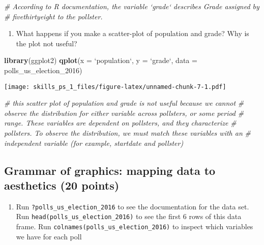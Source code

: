 \documentclass[
]{article}
\newenvironment{Shaded}{\begin{snugshade}}{\end{snugshade}}
\newcommand{\CommentTok}[1]{\textcolor[rgb]{0.56,0.35,0.01}{\textit{#1}}}
\newcommand{\DataTypeTok}[1]{\textcolor[rgb]{0.13,0.29,0.53}{#1}}
\newcommand{\DecValTok}[1]{\textcolor[rgb]{0.00,0.00,0.81}{#1}}
\newcommand{\KeywordTok}[1]{\textcolor[rgb]{0.13,0.29,0.53}{\textbf{#1}}}
\newcommand{\NormalTok}[1]{#1}
\newcommand{\StringTok}[1]{\textcolor[rgb]{0.31,0.60,0.02}{#1}}
\providecommand{\tightlist}{%
  \setlength{\itemsep}{0pt}\setlength{\parskip}{0pt}}
\begin{document}
\begin{Shaded}
\begin{Highlighting}[]
\CommentTok{# According to R documentation, the variable `grade` describes Grade assigned by }
\CommentTok{# fivethirtyeight to the pollster.}
\end{Highlighting}
\end{Shaded}

\begin{enumerate}
\def\labelenumi{\arabic{enumi}.}
\tightlist
\item
  What happens if you make a scatter-plot of population and grade? Why
  is the plot not useful?
\end{enumerate}

\begin{Shaded}
\begin{Highlighting}[]
\KeywordTok{library}\NormalTok{(ggplot2)}
\KeywordTok{qplot}\NormalTok{(}\DataTypeTok{x =} \StringTok{`}\DataTypeTok{population}\StringTok{`}\NormalTok{, }\DataTypeTok{y =} \StringTok{`}\DataTypeTok{grade}\StringTok{`}\NormalTok{, }\DataTypeTok{data =}\NormalTok{ polls_us_election_}\DecValTok{2016}\NormalTok{)}
\end{Highlighting}
\end{Shaded}

\texttt{[image: skills\_ps\_1\_files/figure-latex/unnamed-chunk-7-1.pdf]}

\begin{Shaded}
\begin{Highlighting}[]
\CommentTok{# this scatter plot of population and grade is not useful because we cannot}
\CommentTok{# observe the distribution for either variable across pollsters, or some period }
\CommentTok{# range. These variables are dependent on pollsters, and they characterize }
\CommentTok{# pollsters. To observe the distribution, we must match these variables with an }
\CommentTok{# independent variable (for example, startdate and pollster)}
\end{Highlighting}
\end{Shaded}

\hypertarget{grammar-of-graphics-mapping-data-to-aesthetics-20-points}{%
\subsection{Grammar of graphics: mapping data to aesthetics (20
points)}\label{grammar-of-graphics-mapping-data-to-aesthetics-20-points}}

\begin{enumerate}
\def\labelenumi{\arabic{enumi}.}
\tightlist
\item
  Run \texttt{?polls\_us\_election\_2016} to see the documentation for
  the data set. Run \texttt{head(polls\_us\_election\_2016)} to see the
  first 6 rows of this data frame. Run
  \texttt{colnames(polls\_us\_election\_2016)} to inspect which
  variables we have for each poll
\end{enumerate}
\end{document}
